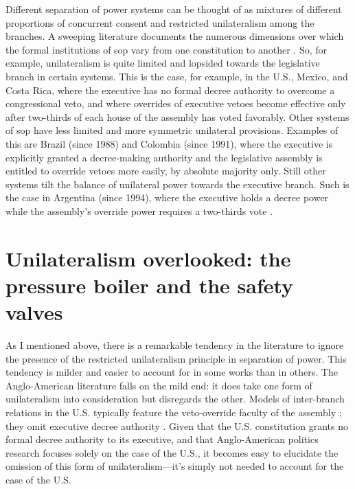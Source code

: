 Different separation of power systems can be thought of as mixtures of different proportions of concurrent consent and restricted unilateralism among the branches.  A sweeping literature documents the numerous dimensions over which the formal institutions of sop vary from one constitution to another \citep{shugart.carey.1992,mainwaring.shugart.1997,carey.shugart.1998}. So, for example, unilateralism is quite limited and lopsided towards the legislative branch in certain systems.  This is the case, for example, in the U.S., Mexico, and Costa Rica, where the executive has no formal decree authority to overcome a congressional veto, and where overrides of executive vetoes become effective only after two-thirds of each house of the assembly has voted favorably.  Other systems of sop have less limited and more symmetric unilateral provisions.  Examples of this are Brazil (since 1988) and Colombia (since 1991), where the executive is explicitly granted a decree-making authority and the legislative assembly is entitled to override vetoes more easily, by absolute majority only.  Still other systems tilt the balance of unilateral power towards the executive branch.  Such is the case in Argentina (since 1994), where the executive holds a decree power while the assembly's override power requires a two-thirds vote \citep[150--5]{shugart.carey.1992}.

\section{Unilateralism overlooked: the pressure boiler and the safety valves}

As I mentioned above, there is a remarkable tendency in the literature to ignore the presence of the restricted unilateralism principle in separation of power.  This tendency is milder and easier to account for in some works than in others.  The Anglo-American literature falls on the mild end: it does take one form of unilateralism into consideration but disregards the other.  Models of inter-branch relations in the U.S. typically feature the veto-override faculty of the assembly \citep{lee.1975,rohde.simon.1985}; they omit executive decree authority \citep[exceptions are][]{sala.1998,moe.howell.1999}.  Given that the U.S. constitution grants no formal decree authority to its executive, and that Anglo-American politics research focuses solely on the case of the U.S., it becomes easy to elucidate the omission of this form of unilateralism---it's simply not needed to account for the case of the U.S.  

